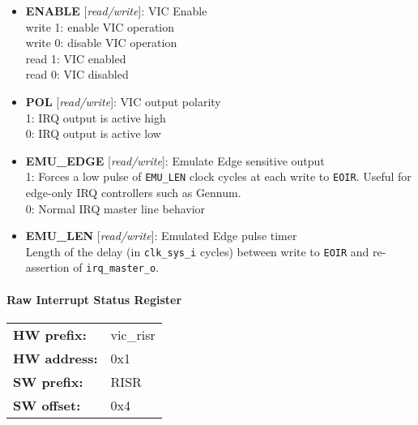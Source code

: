 \begin{itemize}
\item \begin{small}
{\bf 
ENABLE
} [\emph{read/write}]: VIC Enable
\\
write 1: enable VIC operation \\                        write 0: disable VIC operation \\                        read 1: VIC enabled \\                        read 0: VIC disabled
\end{small}
\item \begin{small}
{\bf 
POL
} [\emph{read/write}]: VIC output polarity
\\
1: IRQ output is active high \\                        0: IRQ output is active low
\end{small}
\item \begin{small}
{\bf 
EMU\_EDGE
} [\emph{read/write}]: Emulate Edge sensitive output
\\
1: Forces a low pulse of \texttt{EMU\_LEN} clock cycles at each write to \texttt{EOIR}. Useful for edge-only IRQ controllers such as Gennum. \\                        0: Normal IRQ master line behavior
\end{small}
\item \begin{small}
{\bf 
EMU\_LEN
} [\emph{read/write}]: Emulated Edge pulse timer
\\
Length of the delay (in \texttt{clk\_sys\_i} cycles) between write to \texttt{EOIR} and re-assertion of \texttt{irq\_master\_o}.
\end{small}
\end{itemize}
\paragraph*{Raw Interrupt Status Register}\vspace{12pt}

\begin{tabular}{l l }
{\bf HW prefix:}  & vic\_risr\\
{\bf HW address:}  & 0x1\\
{\bf SW prefix:}  & RISR\\
{\bf SW offset:}  & 0x4\\
\end{tabular}


